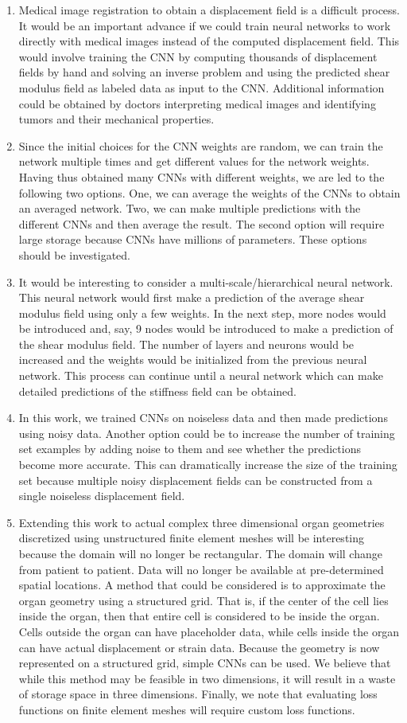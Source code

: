\documentclass[10pt]{article}
\begin{document}
\begin{enumerate}
\item{Medical image registration to obtain a displacement field is a difficult process. It would be an important advance if we could train neural networks to work directly with medical images instead of the computed displacement field. This would involve training the CNN by computing thousands of displacement fields by hand and solving an inverse problem and using the predicted shear modulus field as labeled data as input to the CNN. Additional information could be obtained by doctors interpreting medical images and identifying tumors and their mechanical properties.}
\item{Since the initial choices for the CNN weights are random, we can train the network multiple times and get different values for the network weights. Having thus obtained many CNNs with different weights, we are led to the following two options. One, we can average the weights of the CNNs to obtain an averaged network. Two, we can make multiple predictions with the different CNNs and then average the result. The second option will require large storage because CNNs have millions of parameters. These options should be investigated.}
\item{It would be interesting to consider a multi-scale/hierarchical neural network. This neural network would first make a prediction of the average shear modulus field using only a few weights. In the next step, more nodes would be introduced and, say, 9 nodes would be introduced to make a prediction of the shear modulus field. The number of layers and neurons would be increased and the weights would be initialized from the previous neural network. This process can continue until a neural network which can make detailed predictions of the stiffness field can be obtained.}
\item{In this work, we trained CNNs on noiseless data and then made predictions using noisy data. Another option could be to increase the number of training set examples by adding noise to them and see whether the predictions become more accurate. This can dramatically increase the size of the training set because multiple noisy displacement fields can be constructed from a single noiseless displacement field.}
\item{Extending this work to actual complex three dimensional organ geometries discretized using unstructured finite element meshes will be interesting because the domain will no longer be rectangular. The domain will change from patient to patient. Data will no longer be available at pre-determined spatial locations.  A method that could be considered is to approximate the organ geometry using a structured grid. That is, if the center of the cell lies inside the organ, then that entire cell is considered to be inside the organ. Cells outside the organ can have placeholder data, while cells inside the organ can have actual displacement or strain data. Because the geometry is now represented on a structured grid, simple CNNs can be used. We believe that while this method may be feasible in two dimensions, it will result in a waste of storage space in three dimensions. Finally, we note that evaluating loss functions on finite element meshes will require custom loss functions.}

\end{enumerate}
\end{document}

